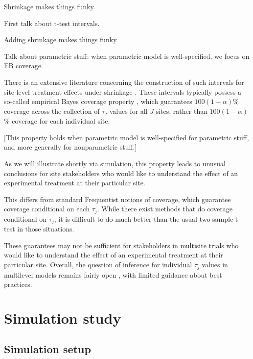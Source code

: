 \documentclass[]{article}
\begin{document}
Shrinkage makes things funky.



First talk about t-test intervals.


Adding shrinkage makes things funky

Talk about parametric stuff: when parametric model is well-specified, we focus on EB coverage.

There is an extensive literature concerning the construction of such intervals for site-level treatment effects under shrinkage \citep{casella2012shrinkage}.
These intervals typically possess a so-called empirical Bayes coverage property \citep{morris1983parametric}, which guarantees $100(1-\alpha)$\% coverage across the collection of $\tau_j$ values for all $J$ sites, rather than $100(1-\alpha)$\% coverage for each individual site.

[This property holds when parametric model is well-specified for parametric stuff, and more generally for nonparametric stuff.]

As we will illustrate shortly via simulation, this property leads to unusual conclusions for site stakeholders who would like to understand the effect of an experimental treatment at their particular site.






This differs from standard Frequentist notions of coverage, which guarantee coverage conditional on each $\tau_j$.
While there exist methods that do coverage conditional on $\tau_j$, it is difficult to do much better than the usual two-sample t-test in those situations.





These guarantees may not be sufficient for stakeholders in multisite trials who would like to understand the effect of an experimental treatment at their particular site.
Overall, the question of inference for individual $\tau_j$ values in multilevel models remains fairly open \citep{armstrong2020robust}, with limited guidance about best practices.

\section{Simulation study}

\subsection{Simulation setup}
\end{document}
